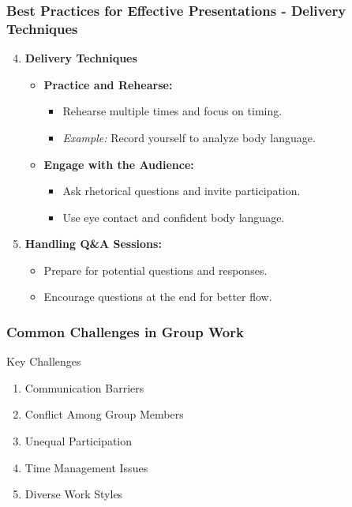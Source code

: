 \documentclass{beamer}
\begin{document}
\begin{frame}[fragile]
    \frametitle{Best Practices for Effective Presentations - Delivery Techniques}
    \begin{enumerate}
        \setcounter{enumi}{3}
        \item \textbf{Delivery Techniques}
            \begin{itemize}
                \item \textbf{Practice and Rehearse:}
                    \begin{itemize}
                        \item Rehearse multiple times and focus on timing.
                        \item \textit{Example:} Record yourself to analyze body language.
                    \end{itemize}

                \item \textbf{Engage with the Audience:}
                    \begin{itemize}
                        \item Ask rhetorical questions and invite participation.
                        \item Use eye contact and confident body language.
                    \end{itemize}
            \end{itemize}

        \item \textbf{Handling Q\&A Sessions:}
            \begin{itemize}
                \item Prepare for potential questions and responses.
                \item Encourage questions at the end for better flow.
            \end{itemize}
    \end{enumerate}
\end{frame}

\begin{frame}[fragile]
    \frametitle{Common Challenges in Group Work}
    \begin{block}{Key Challenges}
        \begin{enumerate}
            \item Communication Barriers
            \item Conflict Among Group Members
            \item Unequal Participation
            \item Time Management Issues
            \item Diverse Work Styles
        \end{enumerate}
    \end{block}
\end{frame}
\end{document}
